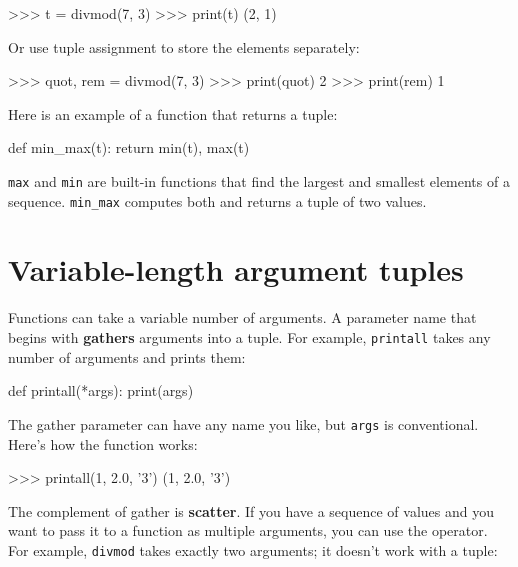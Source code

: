 \beforeverb
\begin{pycode}
>>> t = divmod(7, 3)
>>> print(t)
(2, 1)
\end{pycode}
\afterverb
%
Or use tuple assignment to store the elements separately:


\beforeverb
\begin{pycode}
>>> quot, rem = divmod(7, 3)
>>> print(quot)
2
>>> print(rem)
1
\end{pycode}
\afterverb
%
Here is an example of a function that returns a tuple:

\beforeverb
\begin{pycode}
def min_max(t):
    return min(t), max(t)
\end{pycode}
\afterverb
%
{\tt max} and {\tt min} are built-in functions that find
the largest and smallest elements of a sequence.  \verb"min_max"
computes both and returns a tuple of two values.



\section{Variable-length argument tuples}


Functions can take a variable number of arguments.  A parameter
name that begins with {\tt *} {\bf gathers} arguments into
a tuple.  For example, {\tt printall}
takes any number of arguments and prints them:

\beforeverb
\begin{pycode}
def printall(*args):
    print(args)
\end{pycode}
\afterverb
%
The gather parameter can have any name you like, but {\tt args} is
conventional.  Here's how the function works:

\beforeverb
\begin{pycode}
>>> printall(1, 2.0, '3')
(1, 2.0, '3')
\end{pycode}
\afterverb
%
The complement of gather is {\bf scatter}.  If you have a
sequence of values and you want to pass it to a function
as multiple arguments, you can use the {\tt *} operator.
For example, {\tt divmod} takes exactly two arguments; it
doesn't work with a tuple:

